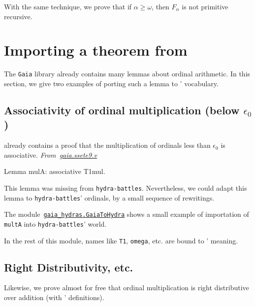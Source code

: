 
With the same technique, we prove that if
$\alpha\geq\omega$, then $F_\alpha$ is not primitive recursive.




\section{Importing a theorem from \gaia}
\label{sect:gaia2hydra}

The \texttt{Gaia} library already contains many lemmas about
ordinal arithmetic. In this section, we give two examples of
porting such a lemma to \HydrasLib' vocabulary.

\subsection{Associativity of ordinal multiplication (below \texorpdfstring{$\epsilon_0$}{epsilon\_0})}
\gaia already contains a proof that the multiplication of ordinals less than $\epsilon_0$ is associative.
\emph{From~\href{https://github.com/coq-community/gaia/blob/master/theories/ssete9.v}{gaia.ssete9.v}}

\begin{Coqsrc}
Lemma mulA: associative T1mul.
\end{Coqsrc}

This lemma was missing from \texttt{hydra-battles}. Nevertheless, we could adapt this lemma to \texttt{hydra-battles}' ordinals, by a small sequence of rewritings.


The module~\href{../theories/html/gaia_hydras.GaiaToHydra.html}%
{\texttt{gaia\_hydras.GaiaToHydra}} shows a small
example of importation of \texttt{multA} into \texttt{hydra-battles}' world.


In the rest of this module, names like  \texttt{T1}, \texttt{omega}, etc. are  bound to \HydrasLib' meaning.


 \subsection{Right Distributivity, etc.}
 Likewise, we prove almost for free that ordinal multiplication is right distributive over addition (with \HydrasLib' definitions).

